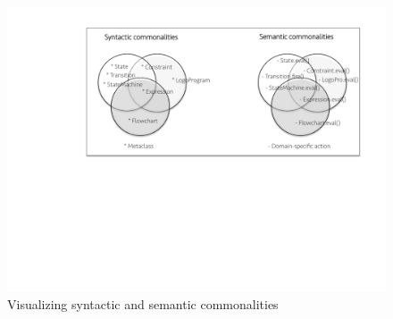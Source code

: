 \begin{figure}
\centering
\includegraphics[width=1\linewidth]{images/domains-inaction.pdf}
\caption{Visualizing syntactic and semantic commonalities}
\label{fig:shape}
\end{figure}







